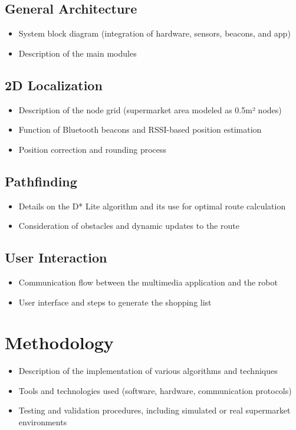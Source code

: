 \documentclass[a4paper,11pt]{article}
\begin{document}
\subsection{General Architecture}
\begin{itemize}
\item System block diagram (integration of hardware, sensors, beacons, and app)
\item Description of the main modules
\end{itemize}

\subsection{2D Localization}
\begin{itemize}
\item Description of the node grid (supermarket area modeled as 0.5m² nodes)
\item Function of Bluetooth beacons and RSSI-based position estimation
\item Position correction and rounding process
\end{itemize}

\subsection{Pathfinding}
\begin{itemize}
\item Details on the D* Lite algorithm and its use for optimal route calculation
\item Consideration of obstacles and dynamic updates to the route
\end{itemize}

\subsection{User Interaction}
\begin{itemize}
\item Communication flow between the multimedia application and the robot
\item User interface and steps to generate the shopping list
\end{itemize}

\section{Methodology}
\begin{itemize}
\item Description of the implementation of various algorithms and techniques
\item Tools and technologies used (software, hardware, communication protocols)
\item Testing and validation procedures, including simulated or real supermarket environments
\end{itemize}
\end{document}
